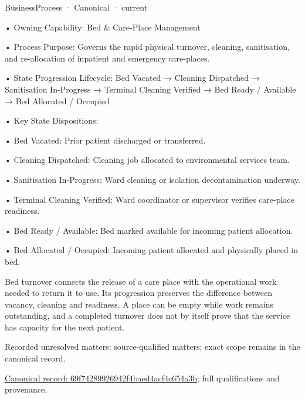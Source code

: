 \label{element:69f74289926942f4baed4acf4c654a3b}
{\small BusinessProcess · Canonical · current}\par

•
Owning Capability: Bed \& Care-Place Management



•
Process Purpose: Governs the rapid physical turnover, cleaning, sanitisation, and re-allocation of inpatient and emergency care-places.



•
State Progression Lifecycle: Bed Vacated → Cleaning Dispatched → Sanitisation In-Progress → Terminal Cleaning Verified → Bed Ready / Available → Bed Allocated / Occupied



•
Key State Dispositions:



•
Bed Vacated: Prior patient discharged or transferred.



•
Cleaning Dispatched: Cleaning job allocated to environmental services team.



•
Sanitisation In-Progress: Ward cleaning or isolation decontamination underway.



•
Terminal Cleaning Verified: Ward coordinator or supervisor verifies care-place readiness.



•
Bed Ready / Available: Bed marked available for incoming patient allocation.



•
Bed Allocated / Occupied: Incoming patient allocated and physically placed in bed.



Bed turnover connects the release of a care place with the operational work needed to return it to use. Its progression preserves the difference between vacancy, cleaning and readiness. A place can be empty while work remains outstanding, and a completed turnover does not by itself prove that the service has capacity for the next patient.


{\small Recorded unresolved matters: source-qualified matters; exact scope remains in the canonical record.}\par
{\footnotesize \href{../../../../../../../../continuum/business/business-process/69f74289926942f4baed4acf4c654a3b.md}{Canonical record: 69f74289926942f4baed4acf4c654a3b}; full qualifications and provenance.}\par
